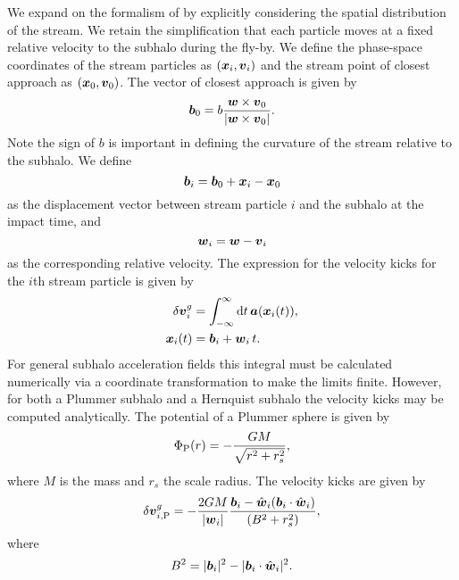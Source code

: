 \documentclass[useAMS,usenatbib,fleqn,a4paper]{mn2e}
\def\d{{\rm d}}
\newcommand{\bs}[1]{\bmath{#1}}
\begin{document}
We expand on the formalism of \cite{ErkalBelokurov2015} by explicitly considering the spatial distribution of the stream. We retain the simplification that each particle moves at a fixed relative velocity to the subhalo during the fly-by. We define the phase-space coordinates of the stream particles as $(\bs{x}_i,\bs{v}_i)$ and the stream point of closest approach as $(\bs{x}_0,\bs{v}_0)$. The vector of closest approach is given by
\begin{equation}
\bs{b}_0=b\frac{\bs{w}\times\bs{v}_0}{|\bs{w}\times\bs{v}_0|}.
\end{equation}
Note the sign of $b$ is important in defining the curvature of the stream relative to the subhalo. We define
\begin{equation}
\bs{b}_i = \bs{b}_0+\bs{x}_i-\bs{x}_0
\end{equation}
as the displacement vector between stream particle $i$ and the subhalo at the impact time, and
\begin{equation}
\bs{w}_i=\bs{w}-\bs{v}_i
\end{equation}
as the corresponding relative velocity. The expression for the velocity kicks for the $i$th stream particle is given by
\begin{equation}
\begin{split}
\delta\bs{v}^g_i &= \int_{-\infty}^{\infty} \d t\,\bs{a}(\bs{x}_i(t)),\\
\bs{x}_i(t)&=\bs{b}_i+\bs{w}_i\,t.
\end{split}
\end{equation}For general subhalo acceleration fields this integral must be calculated numerically via a coordinate transformation to make the limits finite. However, for both a Plummer subhalo and a Hernquist subhalo the velocity kicks may be computed analytically. The potential of a Plummer sphere is given by
\begin{equation}
\Phi_{\rm P}(r) = -\frac{GM}{\sqrt{r^2+r_s^2}},
\end{equation}
where $M$ is the mass and $r_s$ the scale radius. The velocity kicks are given by
\begin{equation}
\delta\bs{v}^{g}_{i,\mathrm{P}} = -\frac{2GM}{|\bs{w}_i|}
\frac{\bs{b}_i-\hat{\bs{w}}_i(\bs{b}_i\cdot\hat{\bs{w}}_i)}
{(B^2+r_s^2)},
\label{curved}
\end{equation}
where
\begin{equation}
B^2=|\bs{b}_i|^2
-|\bs{b}_i\cdot\hat{\bs{w}}_i|^2.
\end{equation}
\end{document}
